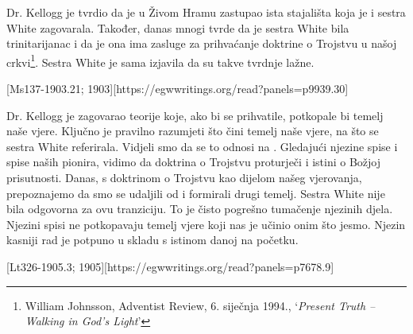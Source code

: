 
Dr. Kellogg je tvrdio da je u Živom Hramu zastupao ista stajališta koja je i sestra White zagovarala. Također, danas mnogi tvrde da je sestra White bila trinitarijanac i da je ona ima zasluge za prihvaćanje doktrine o Trojstvu u našoj crkvi\footnote{William Johnsson, Adventist Review, 6. siječnja 1994., ‘\textit{Present Truth –Walking in God's Light}’}. Sestra White je sama izjavila da su takve tvrdnje lažne.

[Ms137-1903.21; 1903][https://egwwritings.org/read?panels=p9939.30]

Dr. Kellogg je zagovarao teorije koje, ako bi se prihvatile, potkopale bi temelj naše vjere. Ključno je pravilno razumjeti što čini temelj naše vjere, na što se sestra White referirala. Vidjeli smo da se to odnosi na . Gledajući njezine spise i spise naših pionira, vidimo da doktrina o Trojstvu proturječi  i istini o Božjoj prisutnosti. Danas, s doktrinom o Trojstvu kao dijelom našeg vjerovanja, prepoznajemo da smo se udaljili od  i formirali drugi temelj. Sestra White nije bila odgovorna za ovu tranziciju. To je čisto pogrešno tumačenje njezinih djela. Njezini spisi ne potkopavaju temelj vjere koji nas je učinio onim što jesmo. Njezin kasniji rad je potpuno u skladu s istinom danoj na početku.

[Lt326-1905.3; 1905][https://egwwritings.org/read?panels=p7678.9]

